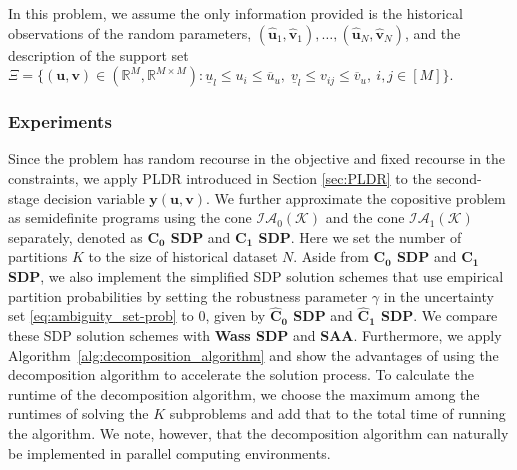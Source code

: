 \documentclass{article}
\newcommand{\RR}{\mathbb{R}}
\begin{document}
In this problem, we assume the only information provided is the historical observations of the random parameters, $(\hat{\bm u}_1, \hat{\bm v}_1),\ldots,(\hat{\bm u}_N, \hat{\bm v}_N)$, and the description of the support set $ \Xi= \{ (\bm u, \bm v) \in (\RR^{M},\RR^{M \times M}) :\underline{u}_l \leq u_i \leq \overline{u}_u, \;\underline{v}_l \leq v_{ij} \leq \overline{v}_u,\ i,j \in [M]\} $.

\subsubsection{Experiments}
Since the problem has random recourse in the objective and fixed recourse in the constraints, we apply PLDR introduced in Section \ref{sec:PLDR} to the second-stage decision variable $\bm y(\bm u, \bm v)$. We further approximate the copositive problem as semidefinite programs using the cone $\mathcal{IA}_0\mathcal{(K)}$ and the cone $\mathcal{IA}_1\mathcal{(K)}$ separately, denoted as \textbf{$\mathbf{C_0}$ SDP} and \textbf{$\mathbf{C_1}$ SDP}. Here we set the number of partitions $K$  to the size of historical dataset $N$. Aside from \textbf{$\mathbf{C_0}$ SDP} and \textbf{$\mathbf{C_1}$ SDP}, we also implement the simplified SDP solution schemes that use empirical partition probabilities by setting the robustness parameter $\gamma$ in the uncertainty set \eqref{eq:ambiguity_set-prob} to $0$, given by \textbf{$\mathbf{\hat{C}_0}$ SDP} and \textbf{$\mathbf{\hat{C}_1}$ SDP}. We compare these SDP solution schemes with \textbf{Wass SDP} and \textbf{SAA}. Furthermore, we apply Algorithm~\ref{alg:decomposition_algorithm} and show the advantages of using the decomposition algorithm to accelerate the solution process.
To calculate the runtime of the decomposition algorithm, we choose the maximum among the runtimes of solving the $K$ subproblems and add that to the total time of running the algorithm. We note, however,  that the decomposition algorithm can naturally be implemented in parallel computing environments. 
\end{document}
